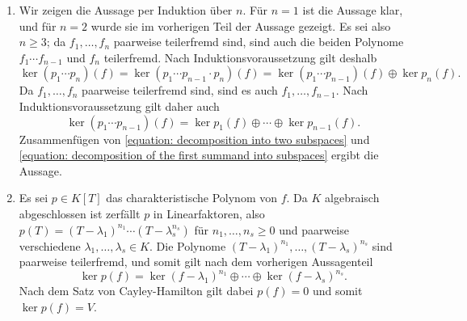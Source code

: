 \begin{solution}
\begin{enumerate}
    \item
      Wir zeigen die Aussage per Induktion über $n$.
      Für $n = 1$ ist die Aussage klar, und für $n = 2$ wurde sie im vorherigen Teil der Aussage gezeigt.
%       
      Es sei also $n \geq 3$; da $f_1, \dotsc, f_n$ paarweise teilerfremd sind, sind auch die beiden Polynome $f_1 \dotsm f_{n-1}$ und $f_n$ teilerfremd.
      Nach Induktionsvoraussetzung gilt deshalb
      \begin{equation}
        \label{equation: decomposition into two subspaces}
          \ker {(p_1 \dotsm p_n)(f)}
        = \ker {(p_1 \dotsm p_{n-1} \cdot p_n)(f)}
        = \ker {(p_1 \dotsm p_{n-1})(f)} \oplus \ker p_n(f).
      \end{equation}
      Da $f_1, \dotsc, f_n$ paarweise teilerfremd sind, sind es auch $f_1, \dotsc, f_{n-1}$.
      Nach Induktionsvoraussetzung gilt daher auch
      \begin{equation}
        \label{equation: decomposition of the first summand into subspaces}
          \ker {(p_1 \dotsm p_{n-1})(f)}
        = \ker p_1(f) \oplus \dotsb \oplus \ker p_{n-1}(f).
      \end{equation}
      Zusammenfügen von \eqref{equation: decomposition into two subspaces} und \eqref{equation: decomposition of the first summand into subspaces} ergibt die Aussage.
    \item
      Es sei $p \in K[T]$ das charakteristische Polynom von $f$.
      Da $K$ algebraisch abgeschlossen ist zerfällt $p$ in Linearfaktoren, also $p(T) = (T - \lambda_1)^{n_1} \dotsm (T - \lambda_s^{n_s})$ für $n_1, \dotsc, n_s \geq 0$ und paarweise verschiedene $\lambda_1, \dotsc, \lambda_s \in K$.
      Die Polynome $(T-\lambda_1)^{n_1}, \dotsc, (T-\lambda_s)^{n_s}$ sind paarweise teilerfremd, und somit gilt nach dem vorherigen Aussagenteil
      \[
          \ker p(f)
        = \ker (f - \lambda_1)^{n_1} \oplus \dotsb \oplus \ker (f - \lambda_s)^{n_s}.
      \]
      Nach dem Satz von Cayley-Hamilton gilt dabei $p(f) = 0$ und somit $\ker p(f) = V$.
  \end{enumerate}
\end{solution}



